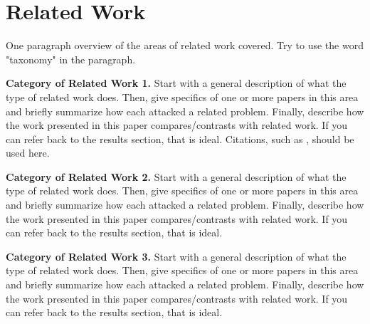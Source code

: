 \section{Related Work}
\label{relatedwork}

One paragraph overview of the areas of
related work covered. Try to use the word
"taxonomy" in the paragraph.

\textbf{Category of Related Work 1.} Start with
a general description of what the type of related
work does. Then, give specifics of one or more
papers in this area and briefly summarize how each
attacked a related problem. Finally, describe
how the work presented in this paper compares/contrasts
with related work. If you can refer back to the
results section, that is ideal. Citations, such as
\cite{rose2006mobile}, should be used here.

\textbf{Category of Related Work 2.} Start with
a general description of what the type of related
work does. Then, give specifics of one or more
papers in this area and briefly summarize how each
attacked a related problem. Finally, describe
how the work presented in this paper compares/contrasts
with related work. If you can refer back to the
results section, that is ideal. 

\textbf{Category of Related Work 3.} Start with
a general description of what the type of related
work does. Then, give specifics of one or more
papers in this area and briefly summarize how each
attacked a related problem. Finally, describe
how the work presented in this paper compares/contrasts
with related work. If you can refer back to the
results section, that is ideal. 